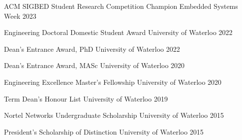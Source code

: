 
\begin{cvhonors}

\cvhonor
{ACM SIGBED Student Research Competition Champion}
{Embedded Systems Week}
{}
{2023}

  \cvhonor
    {Engineering Doctoral Domestic Student Award} %
    {University of Waterloo} %
    {} %
    {2022} %

  \cvhonor
    {Dean's Entrance Award, PhD} %
    {University of Waterloo} %
    {} %
    {2022} %

  \cvhonor
    {Dean's Entrance Award, MASc} %
    {University of Waterloo} %
    {} %
    {2020} %

  \cvhonor
    {Engineering Excellence Master's Fellowship} %
    {University of Waterloo} %
    {} %
    {2020} %

  \cvhonor
    {Term Dean's Honour List} %
    {University of Waterloo} %
    {} %
    {2019} %

  \cvhonor
    {Nortel Networks Undergraduate Scholarship} %
    {University of Waterloo} %
    {} %
    {2015} %

  \cvhonor
    {President’s Scholarship of Distinction} %
    {University of Waterloo} %
    {} %
    {2015} %
    
\end{cvhonors}
